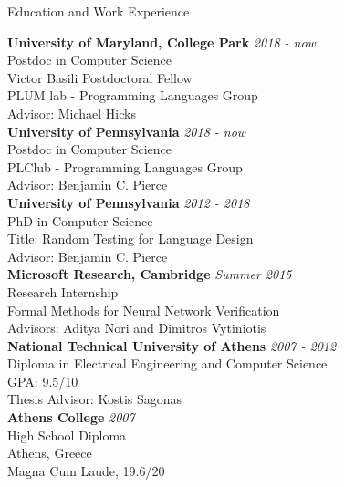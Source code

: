 \documentclass{resume} %
\begin{document}

\newcommand{\edu}[4]{
  {\bf #3} \hfill {\em #2}\\
  {#1}\\
  #4\\
}

\begin{rSection}{Education and Work Experience}

\edu{Postdoc in Computer Science}{2018 - now}
    {University of Maryland, College Park}{
      Victor Basili Postdoctoral Fellow\\
      PLUM lab - Programming Languages Group\\
      Advisor: Michael Hicks
    }

\edu{Postdoc in Computer Science}{2018 - now}
    {University of Pennsylvania}{
      PLClub - Programming Languages Group\\
      Advisor: Benjamin C. Pierce
    }

\edu{PhD in Computer Science}{2012 - 2018}
    {University of Pennsylvania}{
      Title: Random Testing for Language Design\\
      Advisor: Benjamin C. Pierce
    }
    
\edu{Research Internship}{Summer 2015}
    {Microsoft Research, Cambridge}{
      Formal Methods for Neural Network Verification\\
      Advisors: Aditya Nori and Dimitros Vytiniotis
    }

\edu{Diploma in Electrical Engineering and Computer Science}{2007 - 2012}
    {National Technical University of Athens}
    {
      GPA: 9.5/10\\
      Thesis Advisor: Kostis Sagonas
     }

\edu{High School Diploma}{2007}
    {Athens College}
    {Athens, Greece}
    {Magna Cum Laude, 19.6/20}
    
\end{rSection}


\newcommand{\Catalin}{C\u{a}t\u{a}lin\xspace}
\newcommand{\Hritcu}{Hri\c{t}cu\xspace}
\newcommand{\Denes}{D\'en\`es\xspace}
\end{document}
